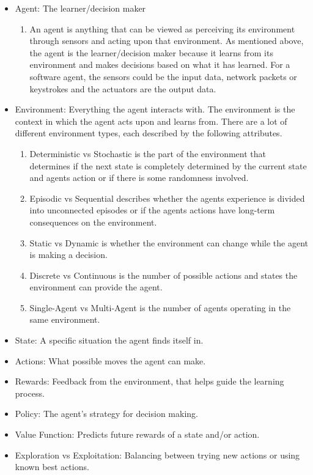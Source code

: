 \begin{itemize}
      \item Agent: The learner/decision maker
            \begin{enumerate}
                  \item An agent is anything that can be viewed as perceiving its environment through
                        sensors and acting upon that environment. As mentioned above, the agent is the learner/decision maker because it
                        learns from its environment and makes decisions based on what it has learned.
                        For a software agent, the sensors could be the input data, network packets or keystrokes
                        and the actuators are the output data. \cite{IntelligentAgents}
            \end{enumerate}
      \item Environment: Everything the agent interacts with. The environment is the context in which the agent acts upon and learns from.
            There are a lot of different environment types, each described by the following attributes. \cite{IntelligentAgents}
            \begin{enumerate}
                  \item Deterministic vs Stochastic is the part of the environment that determines if the next state is completely
                        determined by the current state and agents action or if there is some randomness involved.
                  \item Episodic vs Sequential describes whether the agents experience is divided into unconnected episodes or
                        if the agents actions have long-term consequences on the environment.
                  \item Static vs Dynamic is whether the environment can change while the agent is making a decision.
                  \item Discrete vs Continuous is the number of possible actions and states the environment can provide the agent.
                  \item Single-Agent vs Multi-Agent is the number of agents operating in the same environment.
            \end{enumerate}
      \item State: A specific situation the agent finds itself in.
      \item Actions: What possible moves the agent can make.
      \item Rewards: Feedback from the environment, that helps guide the learning process.
      \item Policy: The agent's strategy for decision making.
      \item Value Function: Predicts future rewards of a state and/or action.
      \item Exploration vs Exploitation: Balancing between trying new actions or using known best actions.
\end{itemize}


